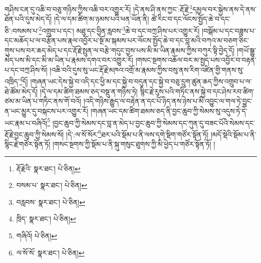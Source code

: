 གཤིས་ངན་དུ་འཆི་བ་བཅུ་གཉིས་ཀྱིས་འཆི་བར་འགྱུར་རོ། །དེ་ནས་ཤི་ནས་ཀྱང་:རྡོ་རྗེ་\footnote{རྡོ་རྗེའི་  སྣར་ཐང་།  པེ་ཅིན། }དམྱལ་བར་སྐྱེས་ནས་དེ་ནས་ཐོན་པའི་དུས་མེད་དོ། །དེ་ལ་དམ་ཚིག་མ་ཉམས་པའི་ཕན་ཡོན་ནི། ཚེ་རིང་བ་དང་ལོངས་སྤྱོད་ཆེ་བ་དང་ཅི་:བསམས་པ་\footnote{བསམ་པ་  སྣར་ཐང་།  པེ་ཅིན། }འགྲུབ་པ་དང་། མཐུ་དང་བྱིན་རླབས་\footnote{བརླབས་  སྣར་ཐང་།  པེ་ཅིན། }ཆེ་བ་དང་བཀྲ་ཤིས་པར་འགྱུར་རོ། །བསྒོམ་པ་དང་བཟླས་པ་དང་མཆོད་པ་ལ་བརྩོན་པས་རྣལ་འབྱོར་པ་སྔོ་མ་སྐམས་པར་ལོངས་སྤྱོད་ཆེ་བ་དང་བླ་མའི་བཀའ་མ་བཅག་ཅིང་གུས་པས་བར་ཆད་མེད་པ་དང་རྡོ་རྗེ་སྤུན་ལ་བརྩེ་གདུང་བྱས་པས་མི་མ་ཡིན་རྣམས་ཀྱིས་བཀུར་སྟི་བྱེད་དོ། །གཡོ་སྒྱུ་མེད་པས་མི་དང་མི་མ་ཡིན་པ་རྣམས་དགའ་བར་འགྱུར་རོ། །གསང་སྔགས་འཆོལ་བར་མ་སྤྱད་པས་འབྱོར་བ་བརྟན་པ་དང་བཀྲ་ཤིས་སོ། །འཆི་བའི་དུས་སུ་ཡང་རྡོ་རྗེ་མཁའ་འགྲོ་མ་རྣམས་ཀྱིས་བསུ་ནས་རིག་འཛིན་གྱི་གནས་སུ་འཁྲིད་\footnote{ཁྲིད་  སྣར་ཐང་།  པེ་ཅིན། }དོ། །གཞན་ཡང་དེས་སྐྱེ་བ་འདི་དང་ཕྱི་མ་དང་སྐྱེ་བ་བདུན་དང་སྐྱེ་བ་བཅུ་དྲུག་ཚུན་ཆད་ཀྱིས་འགྲུབ་པ་ལ་ཐེ་ཚོམ་མེད་དོ། །དེ་ལ་དམ་ཚིག་ཐམས་ཅད་བསྡུ་ན་གཉིས་ཏེ། སྙིང་རྗེ་རུས་པའི་གཏིང་ནས་སྐྱེ་བ་དང་ཤེས་རབ་ཚིག་ཙམ་མ་ཡིན་པ་གཏིང་ནས་གོ་བའོ། །འདི་གཉིས་རྒྱུད་ལ་བརྟེན་ན་དང་པོ་ཉིད་ནས་ཉེས་པ་མི་འབྱུང་ལ་གལ་ཏེ་བྱུང་ན་ཡང་མྱུར་དུ་བསྐངས་པར་འགྱུར་རོ། །གཞན་ཡང་དམ་ཚིག་ཐམས་ཅད་ནི་བྱང་ཆུབ་ཀྱི་སེམས་སུ་འདུས་ཏེ་དེ་ཡང་རྣམ་པ་བཞིའོ།\footnote{གཞིའོ།  པེ་ཅིན། } །བྱང་ཆུབ་ཀྱི་སེམས་དང་བླ་ན་མེད་པ་བྱང་ཆུབ་ཀྱི་སེམས་དང་ཀུན་དུ་བཟང་པོའི་སེམས་དང་རྡོ་རྗེ་བྱང་ཆུབ་ཀྱི་སེམས་སོ། །དེ་:ལ་སོ་སོར་\footnote{ལ་སོ་སོ་  སྣར་ཐང་།  པེ་ཅིན། }ཐར་པའི་སྡོམ་པ་ནི་ལས་དགེ་སྡིག་གཙོར་སྟོན་ཏོ། །མདོ་སྡེའི་སྡོམ་པ་ནི་སྙིང་རྗེ་གཙོར་སྟོན་ཏོ། །གསང་སྔགས་ཀྱི་སྡོམ་པ་ནི་སྐུ་གསུང་ཐུགས་ཀྱི་མི་ཕྱེད་པ་གཙོར་སྟོན་ཏོ། །

